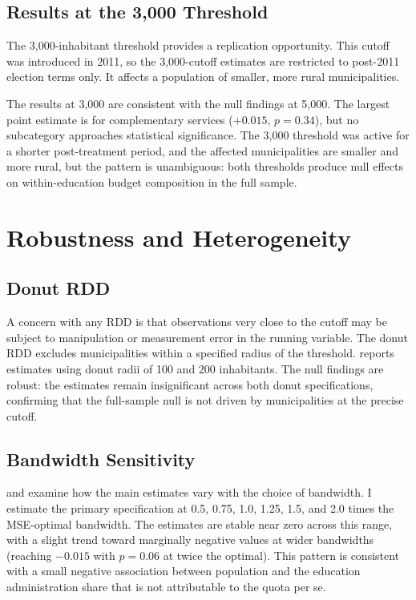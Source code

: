 \documentclass[12pt]{article}
\begin{document}
\subsection{Results at the 3,000 Threshold}

The 3,000-inhabitant threshold provides a replication opportunity. This cutoff was introduced in 2011, so the 3,000-cutoff estimates are restricted to post-2011 election terms only. It affects a population of smaller, more rural municipalities.

The results at 3,000 are consistent with the null findings at 5,000. The largest point estimate is for complementary services ($+0.015$, $p = 0.34$), but no subcategory approaches statistical significance. The 3,000 threshold was active for a shorter post-treatment period, and the affected municipalities are smaller and more rural, but the pattern is unambiguous: both thresholds produce null effects on within-education budget composition in the full sample.


\section{Robustness and Heterogeneity}

\subsection{Donut RDD}

A concern with any RDD is that observations very close to the cutoff may be subject to manipulation or measurement error in the running variable. The donut RDD excludes municipalities within a specified radius of the threshold.  reports estimates using donut radii of 100 and 200 inhabitants. The null findings are robust: the estimates remain insignificant across both donut specifications, confirming that the full-sample null is not driven by municipalities at the precise cutoff.




\subsection{Bandwidth Sensitivity}

 and  examine how the main estimates vary with the choice of bandwidth. I estimate the primary specification at 0.5, 0.75, 1.0, 1.25, 1.5, and 2.0 times the MSE-optimal bandwidth. The estimates are stable near zero across this range, with a slight trend toward marginally negative values at wider bandwidths (reaching $-0.015$ with $p = 0.06$ at twice the optimal). This pattern is consistent with a small negative association between population and the education administration share that is not attributable to the quota per se.
\end{document}
